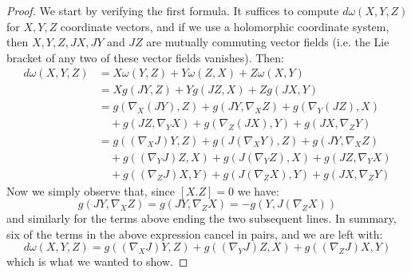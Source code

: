 \documentclass[11pt]{amsart}
\theoremstyle{definition}
\begin{document}
\begin{proof} We start by verifying the first formula.  It suffices to compute $d \omega( X,Y,Z )$ for $X,Y,Z$ coordinate vectors, and if we use a holomorphic coordinate system, then $X,Y,Z,JX,JY$ and $JZ$ are mutually commuting vector fields (i.e. the Lie bracket of any two of these vector fields vanishes).  Then:
%
\begin{align*}
d \omega( X, Y, Z ) &= X \omega(Y,Z) + Y \omega(Z,X) + Z \omega(X,Y) \\
%
&= X g( JY, Z ) + Y g( JZ, X ) + Z g( JX, Y ) \\
%
&= g( \nabla_X (JY), Z ) + g( JY, \nabla_X Z) + g( \nabla_Y (JZ), X )\\
& \quad + g( JZ, \nabla_Y X ) + g( \nabla_Z (JX), Y ) + g( JX, \nabla_Z Y ) \\
%
&= g( (\nabla_X J)Y, Z ) + g( J( \nabla_X Y ), Z ) + g( JY, \nabla_X Z) \\
& \quad + g( (\nabla_Y J)Z, X ) + g( J( \nabla_Y Z ), X ) + g( JZ, \nabla_Y X ) \\
& \quad + g( (\nabla_Z J)X, Y ) + g( J( \nabla_Z X ), Y ) + g( JX, \nabla_Z Y )
\end{align*}
%
Now we simply observe that, since $[X.Z] = 0$ we have:
%
$$ g( JY, \nabla_X Z) = g( JY, \nabla_Z X ) = - g( Y, J( \nabla_Z X ) )$$
%
and similarly for the terms above ending the two subsequent lines.  In summary, six of the terms in the above expression cancel in pairs, and we are left with:
%
$$ d \omega( X, Y, Z ) = g( (\nabla_X J)Y, Z) + g( (\nabla_Y J)Z, X ) + g( (\nabla_Z J)X, Y ) $$
%
which is what we wanted to show.


\end{proof}
\end{document}
